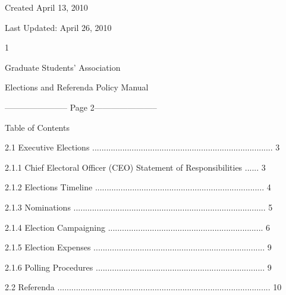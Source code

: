   

  

Created April 13, 2010  

  

Last Updated: April 26, 2010 



                                                                      1  

                                                                                                               

                          Graduate Students’ Association  

                   Elections and Referenda Policy Manual  

  


----------------------- Page 2-----------------------

                                              Table of Contents  

  

2.1        Executive Elections .............................................................................. 3  



   2.1.1           Chief Electoral Officer (CEO) Statement of Responsibilities ...... 3  



   2.1.2           Elections Timeline ......................................................................... 4  



   2.1.3          Nominations ................................................................................... 5  



   2.1.4           Election Campaigning ................................................................... 6  



   2.1.5           Election Expenses .......................................................................... 9  



   2.1.6           Polling Procedures ......................................................................... 9  



2.2        Referenda ............................................................................................ 10  



